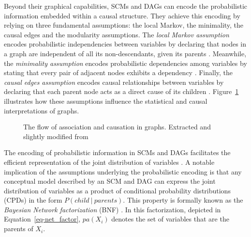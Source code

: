 \documentclass[
  authoryear,
  review,
  1p]{elsarticle}
\begin{document}
Beyond their graphical capabilities, SCMs and DAGs can encode the
probabilistic information embedded within a causal structure. They
achieve this encoding by relying on three fundamental assumptions: the
local Markov, the minimality, the causal edges and the modularity
assumptions. The \emph{local Markov assumption} encodes probabilistic
independencies between variables by declaring that nodes in a graph are
independent of all its non-descendants, given its parents
\citep[pp.~20]{Neal_2020}. Meanwhile, the \emph{minimality assumption}
encodes probabilistic dependencies among variables by stating that every
pair of adjacent nodes exhibits a dependency \citep[pp.~21]{Neal_2020}.
Finally, the \emph{causal edges assumption} encodes causal relationships
between variables by declaring that each parent node acts as a direct
cause of its children \citep[pp.~22]{Neal_2020}. Figure~\ref{fig-ACflow}
illustrates how these assumptions influence the statistical and causal
interpretations of graphs.

\begin{figure}


\caption{\label{fig-ACflow}The flow of association and causation in
graphs. Extracted and slightly modified from \citet[pp.~31]{Neal_2020}}

\end{figure}%

The encoding of probabilistic information in SCMs and DAGs facilitates
the efficient representation of the joint distribution of variables
\citep[pp.~29]{Pearl_et_al_2016}. A notable implication of the
assumptions underlying the probabilistic encoding is that any conceptual
model described by an SCM and DAG can express the joint distribution of
variables as a product of conditional probability distributions (CPDs)
in the form \(P(child \: | \: parents)\). This property is formally
known as the \emph{Bayesian Network factorization} (BNF)
\citetext{\citealp[pp.~29]{Pearl_et_al_2016}; \citealp[pp.~21]{Neal_2020}}.
In this factorization, depicted in Equation~\ref{eq-net_factor},
\(pa(X_{i})\) denotes the set of variables that are the parents of
\(X_{i}\).
\end{document}

